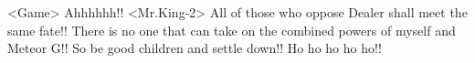 <Game> Ahhhhhh!! 
<Mr.King-2> All of those who oppose Dealer shall meet the same fate!! 
There is no one that can take on the combined powers of myself and Meteor G!! 
So be good children and settle down!! Ho ho ho ho ho!! 
